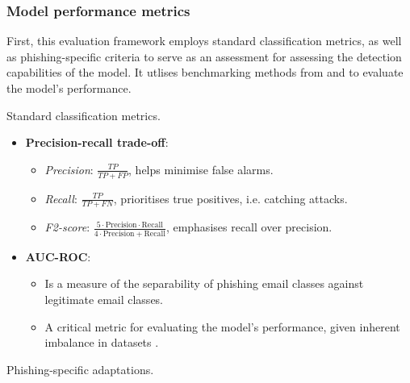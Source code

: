 
\subsubsection*{Model performance metrics}
First, this evaluation framework employs standard classification metrics, as well as phishing-specific criteria to serve as an assessment for assessing the detection capabilities of the model. It utlises benchmarking methods from \cite{kapoor2024comparative} and \cite{zamir2020phishing} to evaluate the model's performance.\newline

\noindent Standard classification metrics.

\begin{itemize}
  \item \textbf{Precision-recall trade-off}:
  \begin{itemize}
    \item \textit{Precision}: $\frac{TP}{TP + FP}$, helps minimise false alarms.
    \item \textit{Recall}: $\frac{TP}{TP + FN}$, prioritises true positives, i.e. catching attacks.
    \item \textit{F2-score}: $\frac{5 \cdot \text{Precision} \cdot \text{Recall}}{4 \cdot \text{Precision} + \text{Recall}}$, emphasises recall over precision.
  \end{itemize}
  \item \textbf{AUC-ROC}:
  \begin{itemize}
    \item Is a measure of the separability of phishing email classes against legitimate email classes.
    \item A critical metric for evaluating the model's performance, given inherent imbalance in datasets \citep{ahmad2024across}.
  \end{itemize}
\end{itemize}

\noindent Phishing-specific adaptations.

